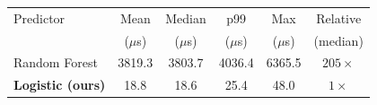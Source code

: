 \begin{tabular}{lccccc}
\toprule
Predictor & Mean & Median & p99 & Max & Relative \\
 & ($\mu$s) & ($\mu$s) & ($\mu$s) & ($\mu$s) & (median) \\
\midrule
Random Forest & 3819.3 & 3803.7 & 4036.4 & 6365.5 & $205\times$ \\
\textbf{Logistic (ours)} & 18.8 & 18.6 & 25.4 & 48.0 & $1\times$ \\
\bottomrule
\end{tabular}
